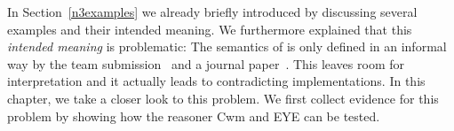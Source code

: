 In Section~\ref{n3examples} we already briefly introduced \nthreelogic by discussing several examples and their intended meaning. We furthermore explained 
that this \emph{intended meaning} 
is problematic: The semantics of \nthreelogic is only defined in an informal way by the \wwwc team submission~\cite{Notation3} and a journal paper~\cite{N3Logic}. 
This leaves room for interpretation and it actually leads to contradicting implementations. In this chapter, we take a closer look to this problem.  
We first collect evidence for this problem by showing how the reasoner Cwm and EYE can be tested.